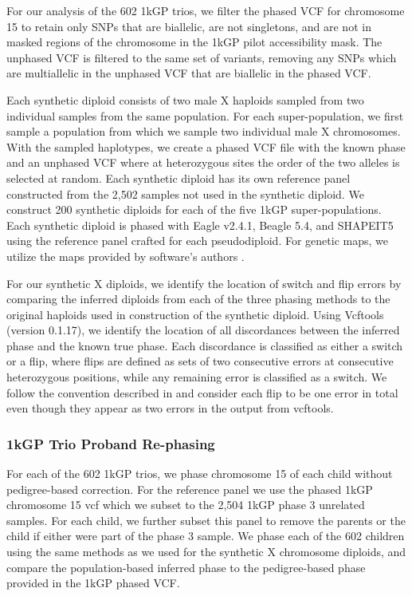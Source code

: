 For our analysis of the 602 1kGP trios, we filter the phased VCF for chromosome 15 to retain only SNPs that are biallelic, are not singletons, and are not in masked regions of the chromosome in the 1kGP pilot accessibility mask. The unphased VCF is filtered to the same set of variants, removing any SNPs which are multiallelic in the unphased VCF that are biallelic in the phased VCF. 

Each synthetic diploid consists of two male X haploids sampled from two individual samples from the same population. For each super-population, we first sample a population from which we sample two individual male X chromosomes. With the sampled haplotypes, we create a phased VCF file with the known phase and an unphased VCF where at heterozygous sites the order of the two alleles is selected at random. Each synthetic diploid has its own reference panel constructed from the 2,502 samples not used in the synthetic diploid. We construct 200 synthetic diploids for each of the five 1kGP super-populations. Each synthetic diploid is phased with Eagle v2.4.1, Beagle 5.4, and SHAPEIT5 using the reference panel crafted for each pseudodiploid. For genetic maps, we utilize the maps provided by software’s authors \cite{Browning2021,Hofmeister2023,Loh2016}.

For our synthetic X diploids, we identify the location of switch and flip errors by comparing the inferred diploids from each of the three phasing methods to the original haploids used in construction of the synthetic diploid. Using Vcftools (version 0.1.17), we identify the location of all discordances between the inferred phase and the known true phase. Each discordance is classified as either a switch or a flip, where flips are defined as sets of two consecutive errors at consecutive heterozygous positions, while any remaining error is classified as a switch. We follow the convention described in \citep{Browning2022} and consider each flip to be one error in total even though they appear as two errors in the output from vcftools.

\subsubsection{1kGP Trio Proband Re-phasing}
For each of the 602 1kGP trios, we phase chromosome 15 of each child without pedigree-based correction. For the reference panel we use the phased 1kGP chromosome 15 vcf which we subset to the 2,504 1kGP phase 3 unrelated samples. For each child, we further subset this panel to remove the parents or the child if either were part of the phase 3 sample. We phase each of the 602 children using the same methods as we used for the synthetic X chromosome diploids, and compare the population-based inferred phase to the pedigree-based phase provided in the 1kGP phased VCF.